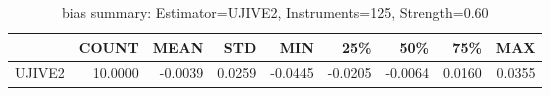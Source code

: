 \begin{table}[ht]
\centering
\caption{bias summary: Estimator=UJIVE2, Instruments=125, Strength=0.60}
\begin{tabular}{lrrrrrrrr}
\toprule
 & COUNT & MEAN & STD & MIN & 25\% & 50\% & 75\% & MAX \\
\midrule
UJIVE2 & 10.0000 & -0.0039 & 0.0259 & -0.0445 & -0.0205 & -0.0064 & 0.0160 & 0.0355 \\
\bottomrule
\end{tabular}
\end{table}
